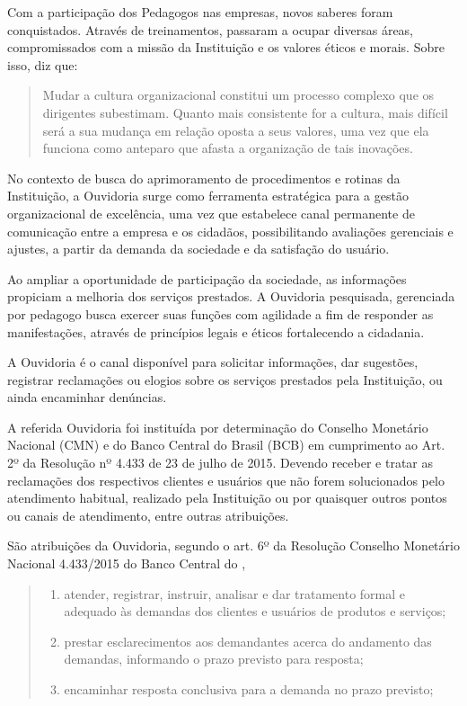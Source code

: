 \begin{refsection}
    Com a participação dos Pedagogos nas empresas, novos saberes foram conquistados. Através de treinamentos, passaram a ocupar diversas áreas, compromissados com a missão da Instituição e os valores éticos e morais. Sobre isso, \textcite[p.~18]{BASTOS2008política} diz que: 

    \begin{quotation}
        Mudar a cultura organizacional constitui um processo complexo que os dirigentes subestimam. Quanto mais consistente for a cultura, mais difícil será a sua mudança em relação oposta a seus valores, uma vez que ela funciona como anteparo que afasta a organização de tais inovações. 
    \end{quotation}

    No contexto de busca do aprimoramento de procedimentos e rotinas da Instituição, a Ouvidoria surge como ferramenta estratégica para a gestão organizacional de excelência, uma vez que estabelece canal permanente de comunicação entre a empresa e os cidadãos, possibilitando avaliações gerenciais e ajustes, a partir da demanda da sociedade e da satisfação do usuário. 

    Ao ampliar a oportunidade de participação da sociedade, as informações propiciam a melhoria dos serviços prestados. A Ouvidoria pesquisada, gerenciada por pedagogo busca exercer suas funções com agilidade a fim de responder as manifestações, através de princípios legais e éticos fortalecendo a cidadania. 

    A Ouvidoria é o canal disponível para solicitar informações, dar sugestões, registrar reclamações ou elogios sobre os serviços prestados pela Instituição, ou ainda encaminhar denúncias. 

    A referida Ouvidoria foi instituída por determinação do Conselho Monetário Nacional (CMN) e do Banco Central do Brasil (BCB) em cumprimento ao Art. 2º da Resolução nº 4.433 de 23 de julho de 2015. Devendo receber e tratar as reclamações dos respectivos clientes e usuários que não forem solucionados pelo atendimento habitual, realizado pela Instituição ou por quaisquer outros pontos ou canais de atendimento, entre outras atribuições.  

    São atribuições da Ouvidoria, segundo o art. 6º da Resolução Conselho Monetário Nacional 4.433/2015 do Banco Central do \textcite[p.~3]{Resolucao4433-2015}, 

    \begin{quotation}
        \noindent\begin{enumerate}[series=lei,label=\Roman*~---]%
            \item atender, registrar, instruir, analisar e dar tratamento formal e adequado às demandas dos clientes e usuários de produtos e serviços;%
            \item prestar esclarecimentos aos demandantes acerca do andamento das demandas, informando o prazo previsto para resposta;%
            \item encaminhar resposta conclusiva para a demanda no prazo previsto;%
        \end{enumerate}
    \end{quotation}


\end{refsection}
